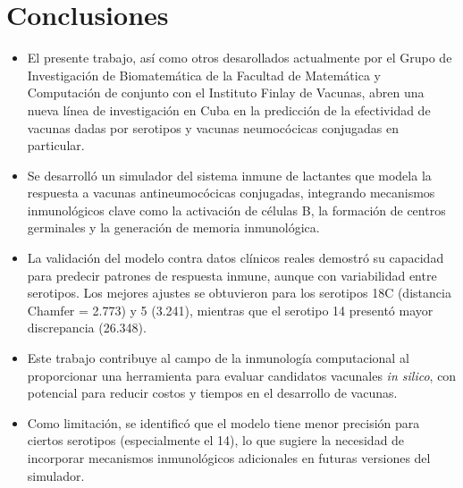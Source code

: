 \chapter*{Conclusiones}\label{chapter:conclusions}

\begin{itemize}
    \item El presente trabajo, así como otros desarollados actualmente por el Grupo de Investigación de Biomatemática de la Facultad de Matemática y Computación de conjunto con el Instituto Finlay de Vacunas, abren una nueva línea de investigación en Cuba en la predicción de la efectividad de vacunas dadas por serotipos y vacunas neumocócicas conjugadas en particular.

    \item Se desarrolló un simulador  del sistema inmune de lactantes que modela la respuesta a vacunas antineumocócicas conjugadas, integrando mecanismos inmunológicos clave como la activación de células B, la formación de centros germinales y la generación de memoria inmunológica.

    \item La validación del modelo contra datos clínicos reales demostró su capacidad para predecir patrones de respuesta inmune, aunque con variabilidad entre serotipos. Los mejores ajustes se obtuvieron para los serotipos 18C (distancia Chamfer = 2.773) y 5 (3.241), mientras que el serotipo 14 presentó mayor discrepancia (26.348).

    \item Este trabajo contribuye al campo de la inmunología computacional al proporcionar una herramienta para evaluar candidatos vacunales \textit{in silico}, con potencial para reducir costos y tiempos en el desarrollo de vacunas. 

    \item Como limitación, se identificó que el modelo tiene menor precisión para ciertos serotipos (especialmente el 14), lo que sugiere la necesidad de incorporar mecanismos inmunológicos adicionales en futuras versiones del simulador.
\end{itemize}

